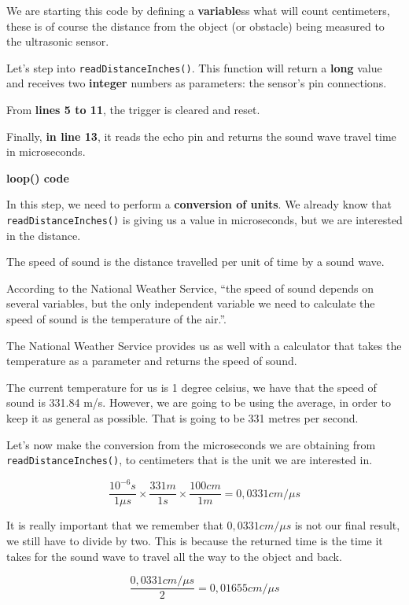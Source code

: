 We are starting this code by defining a \textbf{variable}ss what will count centimeters, these is of course the distance from the object (or obstacle) being measured to the ultrasonic sensor.

Let's step into \verb|readDistanceInches()|. This function will return a \textbf{long} value and receives two \textbf{integer} numbers as parameters: the sensor's pin connections.

From \textbf{lines 5 to 11}, the trigger is cleared and reset.

Finally, \textbf{in line 13}, it reads the echo pin and returns the sound wave travel time in microseconds.

\vspace{5mm}
\textbf{loop() code}

In this step, we need to perform a \textbf{conversion of units}. We already know that \verb|readDistanceInches()| is giving us a value in microseconds, but we are interested in the distance.

The speed of sound is the distance travelled per unit of time by a sound wave.

According to the National Weather Service, ``the speed of sound depends on several variables, but the only independent variable we need to calculate the speed of sound is  the temperature of the air.''\cite{speedofsound}.

The National Weather Service provides us as well with a calculator that takes the temperature as a parameter and returns the speed of sound.

The current temperature for us is 1 degree celsius, we have that the speed of sound is 331.84 m/s. However, we are going to be using the average, in order to keep it as general as possible. That is going to be 331 metres per second.

\vspace{5mm}
Let's now make the conversion from the microseconds we are obtaining from \verb|readDistanceInches()|, to centimeters that is the unit we are interested in.

\[     \frac{10^{-6}s}{1\mu s} \times \frac{331m}{1s} \times \frac{100cm}{1m} = 0,0331cm/\mu s \]

It is really important that we remember that \(0,0331cm/\mu s\) is not our final result, we still have to divide by two. This is because the returned time is the time it takes for the sound wave to travel all the way to the object and back.

\[     \frac{0,0331cm/\mu s}{2} = 0,01655 cm/\mu s \]

